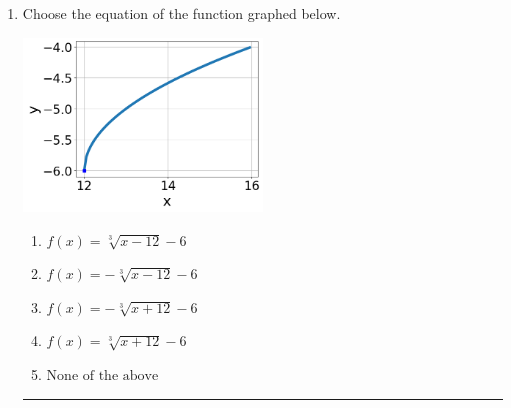 \documentclass[14pt]{extbook}
\newcommand{\litem}[1]{\item#1\hspace*{-1cm}\rule{\textwidth}{0.4pt}}
\begin{document}
\begin{enumerate}
{\begin{enumerate}[label=\Alph*.]
\end{enumerate} }
\litem{
Choose the equation of the function graphed below.
\begin{center}
    \includegraphics[width=0.5\textwidth]{../Figures/radicalGraphToEquationCopyA.png}
\end{center}
\begin{enumerate}[label=\Alph*.]
\item \( f(x) = \sqrt[3]{x - 12} - 6 \)
\item \( f(x) = - \sqrt[3]{x - 12} - 6 \)
\item \( f(x) = - \sqrt[3]{x + 12} - 6 \)
\item \( f(x) = \sqrt[3]{x + 12} - 6 \)
\item \( \text{None of the above} \)

\end{enumerate} }
\end{enumerate}
\end{document}
